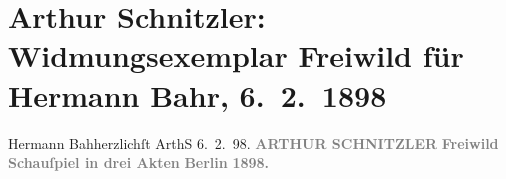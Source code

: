 

         
         \renewcommand{\erwaehntePersonen}{Personen: Hermann Bahr}
         \renewcommand{\erwaehnteInstitutionen}{Institutionen: S. Fischer Verlag}
         \renewcommand{\erwaehnteOrte}{Orte: Berlin, Wien}
         \renewcommand{\erwaehnteWerke}{Werke: Freiwild. Schauspiel in 3 Akten}
               \section[Arthur Schnitzler: Widmungsexemplar Freiwild für Hermann Bahr, 6. 2. 1898]{ Arthur Schnitzler: Widmungsexemplar Freiwild für Hermann Bahr, 6. 2. 1898}\nopagebreak{}\rehead{ }\begin{ledgroupsized}[t]{13cm}\normalsize\beginnumbering \toendnotes[C]{\smallbreak\pagebreak[2]} 
\pstart
           \noindent{}{\pb}Hermann Bah\damage{\textcolor{gray}{r}}{\\}herzlichſt\pend
           \pstart \spacefill\mbox{ArthS\damage{\textcolor{gray}{ch}}}\pend{}\pstart
           \noindent{}6. 2. 98.\pend
           {\bigskip}\pstart
           \noindent{}\centering{}\textcolor{gray}{\textbf{ARTHUR
               SCHNITZLER}}\pend
           {\bigskip}\pstart
           \noindent{}\centering{}\textcolor{gray}{\textbf{Freiwild}}\pend
           \pstart
           \noindent{}\centering{}\textcolor{gray}{\textbf{Schauſpiel in drei Akten}}\pend
           {\bigskip}\pstart
           \noindent{}\centering{}\textcolor{gray}{\textbf{\textbf{Berlin}}}\pend
           \pstart
           \noindent{}\centering{}\textcolor{gray}{\textbf{}}\pend
           \pstart
           \noindent{}\centering{}\textcolor{gray}{\textbf{1898.}}\pend
           
         
         \endnumbering{}\end{ledgroupsized}  \newcommand{\dateiname}{L00774}\newcommand{\titel}{Arthur Schnitzler: Widmungsexemplar Freiwild für Hermann Bahr, 6. 2. 1898}\newcommand{\editorInnen}{ Kurt Ifkovits,  Martin Anton Müller}
      